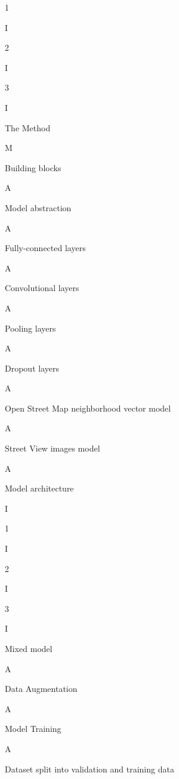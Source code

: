 1

I

2

I

3

I

\chap The Method

M

\sec Building blocks 

A

\secc Model abstraction

A

\secc Fully-connected layers

A

\secc Convolutional layers

A

\secc Pooling layers

A

\secc Dropout layers

A

\sec Open Street Map neighborhood vector model 

A

\sec Street View images model 

A

\secc Model architecture

I

1

I

2

I

3

I

\sec Mixed model 

A

\sec Data Augmentation 

A

\sec Model Training 

A

\secc Dataset split into validation and training data 

